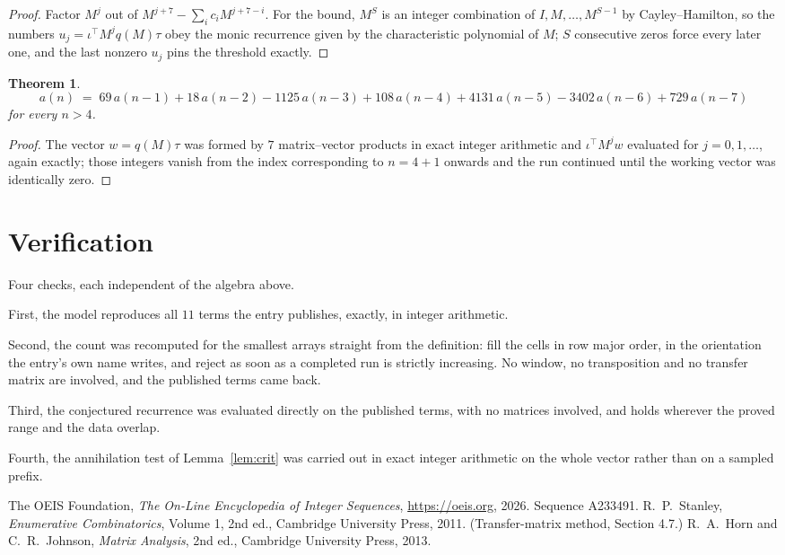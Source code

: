 \documentclass[11pt,a4paper]{article}
\theoremstyle{plain}
\newtheorem{theorem}{Theorem}
\theoremstyle{definition}
\begin{document}
\begin{proof}
Factor $M^{j}$ out of $M^{j+7}-\sum_ic_iM^{j+7-i}$. For the bound, $M^{S}$
is an integer combination of $I,M,\dots,M^{S-1}$ by Cayley--Hamilton, so the numbers
$u_j=\iota^{\!\top}M^{j}q(M)\tau$ obey the monic recurrence given by the characteristic
polynomial of $M$; $S$ consecutive zeros force every later one, and the last nonzero $u_j$
pins the threshold exactly.
\end{proof}

\begin{theorem}
\[
a(n)\;=\;69\,a(n-1) + 18\,a(n-2) - 1125\,a(n-3) + 108\,a(n-4) + 4131\,a(n-5) - 3402\,a(n-6) + 729\,a(n-7)
\]
for every $n>4$.
\end{theorem}

\begin{proof}
The vector $w=q(M)\tau$ was formed by $7$ matrix--vector products in exact integer
arithmetic and $\iota^{\!\top}M^{j}w$ evaluated for $j=0,1,\dots$, again exactly; those
integers vanish from the index corresponding to $n=4+1$ onwards and the run continued
until the working vector was identically zero.
\end{proof}

\section{Verification}

Four checks, each independent of the algebra above.

First, the model reproduces all $11$ terms the entry publishes, exactly, in integer
arithmetic.

Second, the count was recomputed for the smallest arrays straight from the definition: fill the
cells in row major order, in the orientation the entry's own name writes, and reject as soon as
a completed run is strictly increasing. No window, no transposition and no transfer matrix are involved, and
the published terms came back.

Third, the conjectured recurrence was evaluated directly on the published terms, with no
matrices involved, and holds wherever the proved range and the data overlap.

Fourth, the annihilation test of Lemma~\ref{lem:crit} was carried out in exact integer
arithmetic on the whole vector rather than on a sampled prefix.

\begin{thebibliography}{9}
 The OEIS Foundation, \emph{The On-Line Encyclopedia of Integer
Sequences}, \url{https://oeis.org}, 2026. Sequence A233491.
 R.~P.~Stanley, \emph{Enumerative Combinatorics}, Volume 1, 2nd ed.,
Cambridge University Press, 2011. (Transfer-matrix method, Section 4.7.)
 R.~A.~Horn and C.~R.~Johnson, \emph{Matrix Analysis}, 2nd ed., Cambridge
University Press, 2013.
\end{thebibliography}
\end{document}
